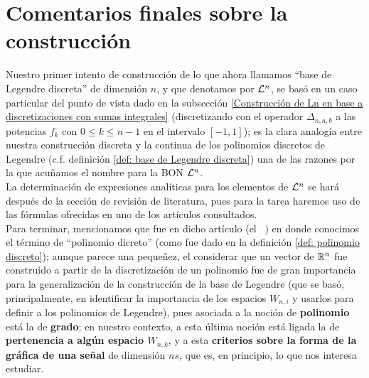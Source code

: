 \section{Comentarios finales sobre la construcción} 
\label{sec: commentarios finales}
Nuestro primer intento de 
construcción de lo que ahora llamamos 
``base de Legendre discreta'' de dimensión $n$,
y que denotamos por
$\mathcal{L}^{n}$, se basó en 
un caso particular del punto de vista
dado en la subsección 
\ref{Construcción de Ln en base a discretizaciones con sumas integrales}
(discretizando con el operador $\Delta_{n,a,b}$
a las potencias $f_{k}$
con $0 \leq k \leq n-1$
en el intervalo $[-1,1]$); es la clara analogía 
entre nuestra construcción discreta y la continua
de los polinomios discretos de Legendre (c.f.
definición \ref{def: base de Legendre discreta}) una de las
razones por la que acuñamos el nombre para
la BON $\mathcal{L}^{n}$. \\ 

La determinación de expresiones analíticas para los
elementos de $\mathcal{L}^{n}$ se hará después de la sección
de revisión de literatura, pues para la tarea haremos uso de las 
fórmulas ofrecidas en uno de los artículos consultados. \\

Para terminar, mencionamos que fue en dicho artículo
(el ~\cite{Neuman})
en donde conocimos el término de ``polinomio dicreto''
(como fue dado en la definición \ref{def: polinomio discreto});
aunque parece una pequeñez, el considerar que
un vector de $\mathbb{R}^{n}$ fue construido a partir
de la discretización de un polinomio fue de gran importancia
para la generalización de la construcción de la base de Legendre
(que se basó, principalmente,
en identificar la importancia de
los espacios $W_{n,i}$ y usarlos para definir
a los polinomios de Legendre),
pues asociada a la noción de \textbf{polinomio} está la de \textbf{grado}; 
en nuestro
contexto, a esta última noción está ligada la de \textbf{pertenencia a
algún espacio $W_{n,k}$}, y a esta \textbf{criterios sobre la forma de la
gráfica de una señal}
de dimensión $ns$, que es, en principio, lo que nos interesa estudiar.